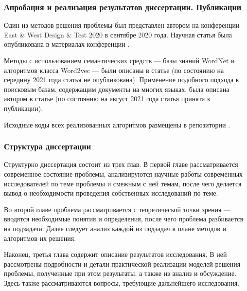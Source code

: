 \subsubsection{Апробация и реализация результатов диссертации. Публикации}
Один из методов решения проблемы был представлен автором на конференции East \& West Design \& Test 2020 в сентябре 2020 года.
Научная статья была опубликована в материалах конференции \cite{9224840}.

Методы с использованием семантических средств --- базы знаний WordNet и алгоритмов класса Word2vec --- были описаны в статье 
\cite{art1} (по состоянию на середину 2021 года статья не опубликована). Применение подобного подхода к поисковым базам,
содержащим документы на многих языках, была описана автором в статье \cite{art2} (по состоянию на август 2021 года
статья принята к публикации).

Исходные коды всех реализованных алгоритмов размещены в репозитории \cite{source-repo}.

\subsubsection{Структура диссертации}
Структурно диссертация состоит из трех глав. В первой главе рассматривается современное состояние проблемы, анализируются
научные работы современных исследователей по теме проблемы и смежным с ней темам, после чего делается вывод о необходимости
проведения собственных исследований по теме.

Во второй главе проблема рассматривается с теоретической точки зрения --- вводятся необходимые понятия и определения, после чего
проблема разбивается на подзадачи. Далее следует анализ каждой из подзадач в плане методов и алгоритмов их решения.

Наконец, третья глава содержит описание результатов исследования. В ней рассмотрены подробности и детали практической реализации
моделей решения проблемы, полученные при этом результаты, а также из анализ и обсуждение. Здесь также рассматриваются вопросы,
требующие дальнейшего исследования.